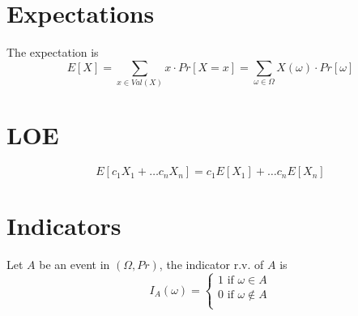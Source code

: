 \section{Expectations}

\begin{framed}
   The expectation is 
   \[
      E[X] = \sum_{x \in Val(X)} x \cdot Pr[X = x] = \sum_{\omega \in \Omega} X(\omega) \cdot Pr[\omega]
   \] 
\end{framed}

\section{LOE}
\begin{framed}
   \[
      E[c_1 X_1 + \hdots c_n X_n] = c_1 E[X_1] + \hdots c_n E[X_n]
   \]  
  
\end{framed}

\section{Indicators}

\begin{framed}
   Let $A$ be an event in $(\Omega, Pr)$, the indicator r.v. of $A$ is
   \[
     I_A(\omega) = 
     \begin{cases}
        1 \text{ if } \omega \in A \\
        0 \text{ if } \omega \notin A \\
     \end{cases}
   \] 
\end{framed}

